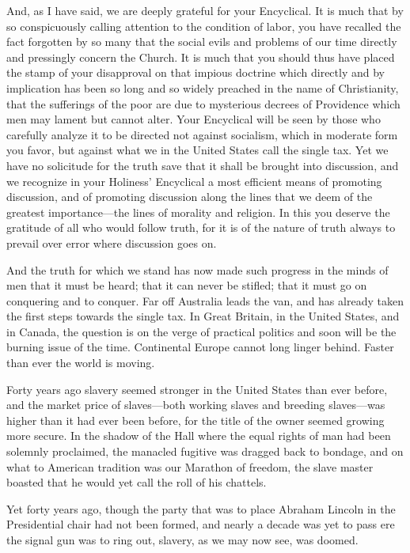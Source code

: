 \documentclass{book}
\begin{document}
And, as I have said, we are deeply grateful for your Encyclical. It is much that by so conspicuously calling attention to the condition of labor, you have recalled the fact forgotten by so many that the social evils and problems of our time directly and pressingly concern the Church. It is much that you should thus have placed the stamp of your disapproval on that impious doctrine which directly and by implication has been so long and so widely preached in the name of Christianity, that the sufferings of the poor are due to mysterious decrees of Providence which men may lament but cannot alter. Your Encyclical will be seen by those who carefully analyze it to be directed not against socialism, which in moderate form you favor, but against what we in the United States call the single tax. Yet we have no solicitude for the truth save that it shall be brought into discussion, and we recognize in your Holiness’ Encyclical a most efficient means of promoting discussion, and of promoting discussion along the lines that we deem of the greatest importance—the lines of morality and religion. In this you deserve the gratitude of all who would follow truth, for it is of the nature of truth always to prevail over error where discussion goes on.

And the truth for which we stand has now made such progress in the minds of men that it must be heard; that it can never be stifled; that it must go on conquering and to conquer. Far off Australia leads the van, and has already taken the first steps towards the single tax. In Great Britain, in the United States, and in Canada, the question is on the verge of practical politics and soon will be the burning issue of the time. Continental Europe cannot long linger behind. Faster than ever the world is moving.

Forty years ago slavery seemed stronger in the United States than ever before, and the market price of slaves—both working slaves and breeding slaves—was higher than it had ever been before, for the title of the owner seemed growing more secure. In the shadow of the Hall where the equal rights of man had been solemnly proclaimed, the manacled fugitive was dragged back to bondage, and on what to American tradition was our Marathon of freedom, the slave master boasted that he would yet call the roll of his chattels.

Yet forty years ago, though the party that was to place Abraham Lincoln in the Presidential chair had not been formed, and nearly a decade was yet to pass ere the signal gun was to ring out, slavery, as we may now see, was doomed.
\end{document}
